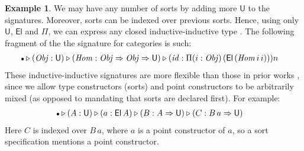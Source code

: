 \documentclass[12pt,a4paper,twoside,openany]{book}
\theoremstyle{remark}
\theoremstyle{definition}
\newtheorem{myexample}{Example}
\theoremstyle{theorem}
\newcommand{\mi}[1]{\mathit{#1}}
\newcommand{\U}{\mathsf{U}}
\newcommand{\El}{\mathsf{El}}
\newcommand{\ext}{\triangleright}
\newcommand{\emptycon}{\scaleobj{.75}\bullet}
\newcommand{\funi}{\Rightarrow}
\begin{document}
\begin{myexample}
We may have any number of sorts by adding more $\U$ to the signatures. Moreover,
sorts can be indexed over previous sorts. Hence, using only $\U$, $\El$ and
$\Pi$, we can express any closed inductive-inductive type \cite{TODO}. The
following fragment of the the signature for categories is such:
\begin{alignat*}{3}
  & \emptycon \ext (\mi{Obj} : \U) \ext (\mi{Hom} : \mi{Obj} \funi \mi{Obj} \funi \U)
      \ext (\mi{id} : \Pi(i : \mi{Obj})\,(\El\,(\mi{Hom}\,i\,i)))n
\end{alignat*}
These inductive-inductive signatures are more flexible than those in prior works
\cite{TODO}, since we allow type constructors (sorts) and point constructors to
be arbitrarily mixed (as opposed to mandating that sorts are declared first). For example:
\begin{alignat*}{3}
  & \emptycon \ext (A : \U) \ext (a : \El\,A) \ext (B : A \funi \U) \ext (C : B\,a \funi \U)
\end{alignat*}
Here $C$ is indexed over $B\,a$, where $a$ is a point constructor of $a$, so a
sort specification mentions a point constructor.
\end{myexample}
\end{document}
